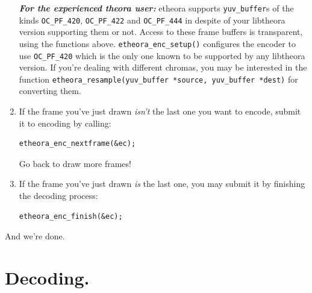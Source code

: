 \documentclass{article}
\begin{document}
\begin{enumerate}
\textbf{\textit{For the experienced theora user: }} etheora supports 
\texttt{yuv\_buffer}s of the kinds \texttt{OC\_PF\_420}, 
\texttt{OC\_PF\_422} and \texttt{OC\_PF\_444} in despite of
your libtheora version supporting them or not. Access to these
frame buffers is transparent, using the functions above. 
\texttt{etheora\_enc\_setup()} configures the encoder to use 
\texttt{OC\_PF\_420} which is the only one known to be 
supported by any libtheora version. If you're dealing with 
different chromas, you may be interested in the function 
\texttt{etheora\_resample(yuv\_buffer *source, yuv\_buffer 
*dest)} for converting them. 

\item If the frame you've just drawn \textit{isn't} the last one you
want to encode, submit it to encoding by calling: 
\begin{verbatim}
etheora_enc_nextframe(&ec);  
\end{verbatim}
Go back to draw more frames! 

\item If the frame you've just drawn \textit{is} the last one, you 
may submit it by finishing the decoding process: 
\begin{verbatim}
etheora_enc_finish(&ec);
\end{verbatim}

\end{enumerate}

And we're done. 

\section{Decoding.}
\end{document}
